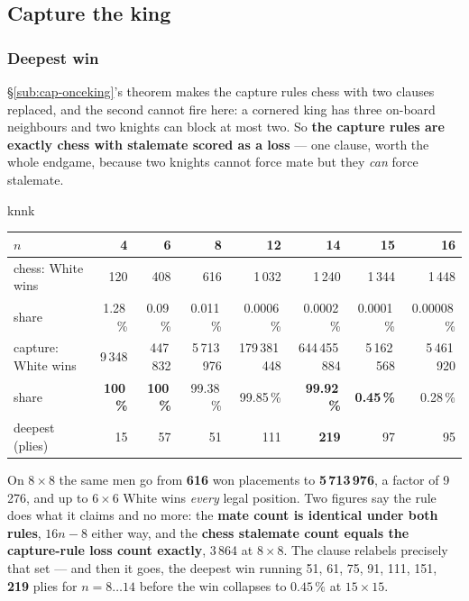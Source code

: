 \documentclass[10pt]{article}
\begin{document}
\subsection{Capture the king}\label{sub:knights-capture}

\subsubsection{Deepest win}\label{sub:kn-capture}

\noindent
\S\ref{sub:cap-onceking}'s theorem makes the capture rules chess with two
clauses replaced, and the second cannot fire here: a cornered king has three
on-board neighbours and two knights can block at most two. So \textbf{the
capture rules are exactly chess with stalemate scored as a loss} --- one
clause, worth the whole endgame, because two knights cannot force mate but they
\emph{can} force stalemate.

\begin{result}[title={One clause, and a drawn endgame becomes a won one}]{knnk}
\begin{center}\small
\begin{tabular}{@{}lrrrrrrr@{}}
\toprule
$n$ & 4 & 6 & 8 & 12 & \textbf{14} & \textbf{15} & 16 \\
\midrule
chess: White wins        & 120 & 408 & 616 & 1\,032 & 1\,240 & 1\,344 & 1\,448 \\
\quad share              & 1.28\,\% & 0.09\,\% & 0.011\,\% & 0.0006\,\% & 0.0002\,\% & 0.0001\,\% & 0.00008\,\% \\
\addlinespace
capture: White wins      & 9\,348 & 447\,832 & 5\,713\,976 & 179\,381\,448 & 644\,455\,884 & 5\,162\,568 & 5\,461\,920 \\
\quad share              & \textbf{100\,\%} & \textbf{100\,\%} & 99.38\,\% & 99.85\,\% & \textbf{99.92\,\%} & \textbf{0.45\,\%} & 0.28\,\% \\
\quad deepest (plies)    & 15 & 57 & 51 & 111 & \textbf{219} & 97 & 95 \\
\bottomrule
\end{tabular}
\end{center}

\smallskip
On $8\times8$ the same men go from \textbf{616} won placements to
\textbf{5\,713\,976}, a factor of 9\,276, and up to $6\times6$ White wins
\emph{every} legal position. Two figures say the rule does what it claims and
no more: the \textbf{mate count is identical under both rules}, $16n-8$ either
way, and the \textbf{chess stalemate count equals the capture-rule loss count
exactly}, 3\,864 at $8\times8$. The clause relabels precisely that set --- and
then it goes, the deepest win running 51, 61, 75, 91, 111, 151, \textbf{219}
plies for $n=8\ldots14$ before the win collapses to $0.45\,\%$ at
$15\times15$.
\label{sub:kn-vanish}
\end{result}
\end{document}
